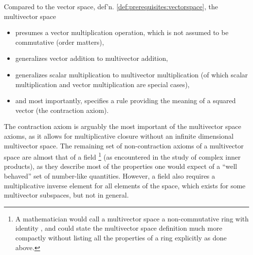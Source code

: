 Compared to the vector space, def'n. \ref{def:prerequisites:vectorspace}, the multivector space

\begin{itemize}
\item presumes a vector multiplication operation, which is not assumed to be commutative (order matters),
\item generalizes vector addition to multivector addition,
\item generalizes scalar multiplication to multivector multiplication (of which scalar multiplication and vector multiplication are special cases),
\item and most importantly, specifies a rule providing the meaning of a squared vector (the contraction axiom).
\end{itemize}

The contraction axiom is arguably the most important of the multivector space axioms, as it allows for multiplicative closure without an infinite dimensional multivector space.
The remaining set of non-contraction axioms of a multivector space are almost that of a field
\footnote{A mathematician would call a multivector space a non-commutative ring with identity \citep{van1943modern}, and could state the multivector space definition much more compactly without listing all the properties of a ring explicitly as done above.}
(as encountered in the study of complex inner products),
as they describe most of the properties one
would expect of a ``well behaved'' set of number-like quantities.
However, a field also requires a multiplicative inverse element for all elements of the space, which exists for some multivector subspaces, but not in general.


